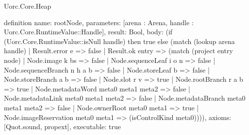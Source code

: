 \begin{lexlean}{Uorc.Core.Heap}
\begin{semanticmodule}
definition{
  name: rootNode,
  parameters: [arena : Arena, handle : Uorc.Core.RuntimeValue::Handle],
  result: Bool,
  body: (if (Uorc.Core.RuntimeValue::isNull handle) then true else (match (lookup arena handle)
    | Result.error e => false
    | Result.ok entry => (match (project entry node)
      | Node.image k bs => false
      | Node.sequenceLeaf i o n => false
      | Node.sequenceBranch n h a b => false
      | Node.storeLeaf b => false
      | Node.storeBranch a b => false
      | Node.slot r v => true
      | Node.rootBranch r a b => true
      | Node.metadataWord meta0 meta1 meta2 => false
      | Node.metadataLink meta0 meta1 meta2 => false
      | Node.metadataBranch meta0 meta1 meta2 => false
      | Node.ownerRoot meta0 meta1 => true
      | Node.imageReservation meta0 meta1 => (isControlKind meta0)))),
  axioms: [Quot.sound, propext],
  executable: true
}


\end{semanticmodule}
\end{lexlean}
